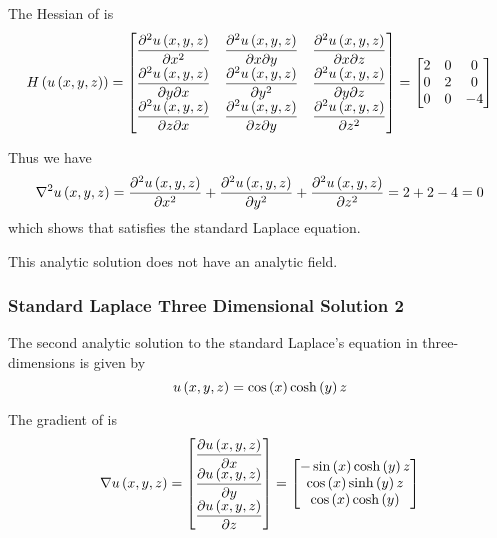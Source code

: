 The Hessian of  is
\begin{equation}
  \hessian{}{\fnof{u}{x,y,z}}=\begin{bmatrix}
  \deltwosqby{\fnof{u}{x,y,z}}{x} & \deltwoby{\fnof{u}{x,y,z}}{x}{y} & \deltwoby{\fnof{u}{x,y,z}}{x}{z} \\
  \deltwoby{\fnof{u}{x,y,z}}{y}{x} & \deltwosqby{\fnof{u}{x,y,z}}{y} & \deltwoby{\fnof{u}{x,y,z}}{y}{z} \\
  \deltwoby{\fnof{u}{x,y,z}}{z}{x} & \deltwoby{\fnof{u}{x,y,z}}{z}{y} & \deltwosqby{\fnof{u}{x,y,z}}{z}
  \end{bmatrix}=\begin{bmatrix}
  2 & 0 & 0 \\
  0 & 2 & 0 \\
  0 & 0 & -4 \\
  \end{bmatrix}
  \label{eqn:StandardLaplaceThreeDAnalyticHessian1}
\end{equation}

Thus we have
\begin{equation}
  \laplacian{}{\fnof{u}{x,y,z}}=\deltwosqby{\fnof{u}{x,y,z}}{x}+\deltwosqby{\fnof{u}{x,y,z}}{y}+\deltwosqby{\fnof{u}{x,y,z}}{z}=
  2+2-4=0
\end{equation}
which shows that  satisfies the standard Laplace equation.

This analytic solution does not have an analytic field.

\subsubsection{Standard Laplace Three Dimensional Solution 2}
 
The second analytic solution to the standard Laplace's equation in three-dimensions is given by
\begin{equation}
  \fnof{u}{x,y,z}=\cosine{x}\hypecosine{y}z
  \label{eqn:StandardLaplaceThreeDAnalytic2}
\end{equation}

The gradient of  is
\begin{equation}
  \gradient{}{\fnof{u}{x,y,z}}=\begin{bmatrix}
  \delby{\fnof{u}{x,y,z}}{x} \\
  \delby{\fnof{u}{x,y,z}}{y} \\
  \delby{\fnof{u}{x,y,z}}{z}
  \end{bmatrix}=\begin{bmatrix}
  -\sine{x}\hypecosine{y}z \\
  \cosine{x}\hypesine{y}z \\
  \cosine{x}\hypecosine{y}
  \end{bmatrix}
  \label{eqn:StandardLaplaceThreeDAnalyticGradient2}
\end{equation}

